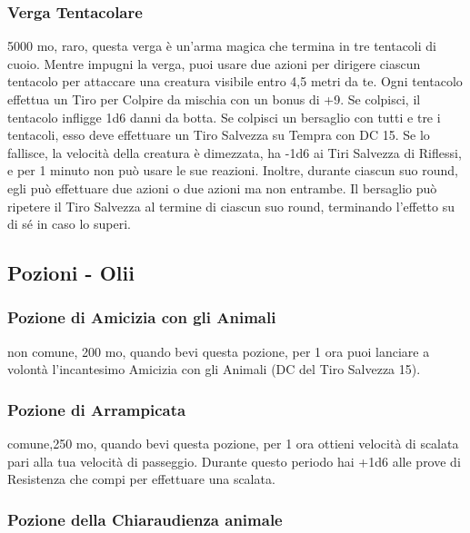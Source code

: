 \begin{multicols}{2}
	\subsubsection*{Verga Tentacolare}
	5000 mo, raro, questa verga è un'arma magica che termina in tre tentacoli di cuoio. Mentre impugni la verga, puoi usare due azioni per dirigere ciascun tentacolo per attaccare una creatura visibile entro 4,5 metri da te. Ogni tentacolo effettua un Tiro per Colpire da mischia con un bonus di +9. Se colpisci, il tentacolo infligge 1d6 danni da botta. Se colpisci un bersaglio con tutti e tre i tentacoli, esso deve effettuare un Tiro Salvezza su Tempra con DC 15. Se lo fallisce, la velocità della creatura è dimezzata, ha -1d6 ai Tiri Salvezza di Riflessi, e per 1 minuto non può usare le sue reazioni. Inoltre, durante ciascun suo round, egli può effettuare due azioni o due azioni ma non entrambe. Il bersaglio può ripetere il Tiro Salvezza al termine di ciascun suo round, terminando l'effetto su di sé in caso lo superi.


	\subsection{Pozioni - Olii}

	\subsubsection*{Pozione di Amicizia con gli Animali}

	non comune, 200 mo, quando bevi questa pozione, per 1 ora puoi lanciare a volontà l'incantesimo Amicizia con gli Animali (DC del Tiro Salvezza 15).

	\subsubsection*{Pozione di Arrampicata}

	comune,250 mo, quando bevi questa pozione, per 1 ora ottieni velocità di scalata pari alla tua velocità di passeggio. Durante questo periodo hai +1d6 alle prove di Resistenza che compi per effettuare una scalata.

	\subsubsection*{Pozione della Chiaraudienza animale}


\end{multicols}
